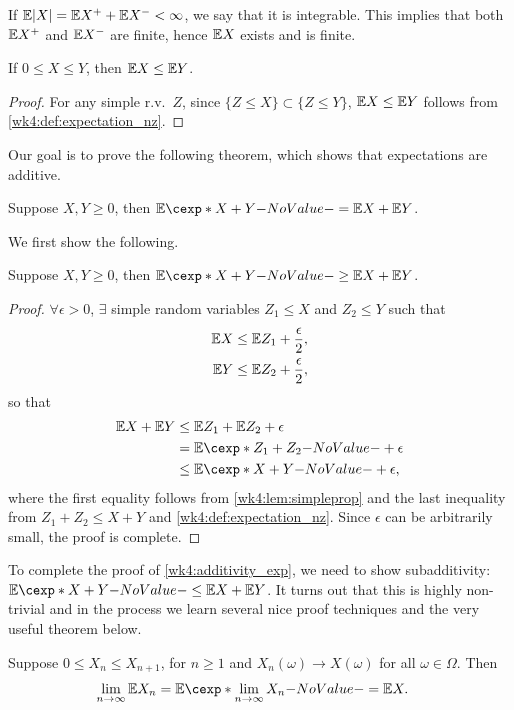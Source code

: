 \documentclass[12pt]{article}
\begin{document}
If $\E|X| = \E X^+ + \E X^-<\infty$, we say that it is integrable. This implies that both $\E X^+$ and $\E X^-$ are finite, hence $\E X$ exists and is finite.

\begin{Lemma}\label{wk4:lem:XlessY}
If $0\leq X \leq Y$, then $\E X \leq \E Y$.
\end{Lemma}
\begin{proof}
For any simple r.v.\ $Z$, since $\{Z\leq X\} \subset \{Z\leq Y\}$, $\E X \leq \E Y$ follows from \cref{wk4:def:expectation_nz}.
\end{proof}

Our goal is to prove the following theorem, which shows that expectations are additive.

\begin{Theorem}\label{wk4:additivity_exp}
Suppose $X,Y\geq 0$, then $\E[X+Y] = \E X+\E Y$. 
\end{Theorem}

We first show the following.
\begin{Lemma} 
Suppose $X,Y\geq 0$, then $\E[X+Y] \geq \E X+\E Y$.
\end{Lemma}
\begin{proof}
$\forall \epsilon>0$, $\exists$ simple random variables $Z_1\leq X$ and $Z_2 \leq Y$ such that
\begin{align*}
\E X & \leq \E Z_1+\frac{\epsilon}{2},\\
\E Y & \leq \E Z_2+\frac{\epsilon}{2},
\end{align*}
so that
\begin{align*}
\E X+\E Y 
&\leq \E Z_1 + \E Z_2 + \epsilon\\
& = \E[Z_1+Z_2]+\epsilon \\
& \leq \E[X+Y]+\epsilon,
\end{align*}
where the first equality follows from \cref{wk4:lem:simpleprop} and the last inequality from $Z_1+Z_2\leq X+Y$ and \cref{wk4:def:expectation_nz}. Since $\epsilon$ can be arbitrarily small, the proof is complete.
\end{proof}

To complete the proof of \cref{wk4:additivity_exp}, we need to show subadditivity: $\E[X+Y] \leq \E X + \E Y$. It turns out that this is highly non-trivial and in the process we learn several nice proof techniques and the very useful theorem below.

\begin{Theorem}\label{Monotone Convergence Theorem}
Suppose $0 \leq X_n \leq X_{n+1}$, for $n \geq 1$ and $X_n(\omega) \to X(\omega)$ for all $\omega\in\Omega$. Then 
\begin{align*}
\lim_{n\to \infty}\E X_n &= \E[\lim_{n\to \infty}X_n]= \E X.
\end{align*}
\end{Theorem}
\end{document}
